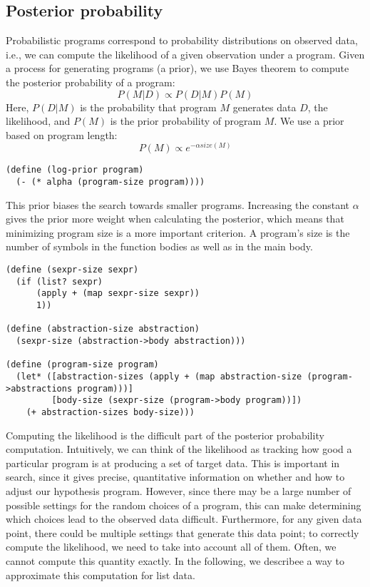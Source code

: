 \documentclass[a4paper,10pt]{article}
\begin{document}
\subsection{Posterior probability}

Probabilistic programs correspond to probability distributions on observed data, i.e., we can compute the likelihood of a given observation under a program. Given a process for generating programs (a prior), we use Bayes theorem to compute the posterior probability of a program:
\begin{equation}P(M|D)\propto P(D|M)P(M)\end{equation}
Here, $P(D|M)$ is the probability that program $M$ generates data $D$, the likelihood, and $P(M)$ is the prior probability of program $M$. We use a prior based on program length:
\begin{equation}P(M)\propto e^{-\alpha \mathit{size}(M)}\end{equation}
\begin{lstlisting}[frame=trBL]
(define (log-prior program)
  (- (* alpha (program-size program))))
\end{lstlisting}
This prior biases the search towards smaller programs. Increasing the constant $\alpha$ gives the prior more weight when calculating the posterior, which means that minimizing program size is a more important criterion. A program's size is the number of symbols in the function bodies as well as in the main body.
\begin{lstlisting}[frame=trBL]
(define (sexpr-size sexpr)
  (if (list? sexpr)
      (apply + (map sexpr-size sexpr))
      1))

(define (abstraction-size abstraction)
  (sexpr-size (abstraction->body abstraction)))
  
(define (program-size program)
  (let* ([abstraction-sizes (apply + (map abstraction-size (program->abstractions program)))]
         [body-size (sexpr-size (program->body program))])
    (+ abstraction-sizes body-size)))
\end{lstlisting}
Computing the likelihood is the difficult part of the posterior probability computation. Intuitively, we can think of the likelihood as tracking how good a particular program is at producing a set of target data.  This is important in search, since it gives precise, quantitative information on whether and how to adjust our hypothesis program. However, since there may be a large number of possible settings for the random choices of a program, this can make determining which choices lead to the observed data difficult. Furthermore, for any given data point, there could be multiple settings that generate this data point; to correctly compute the likelihood, we need to take into account all of them. Often, we cannot compute this quantity exactly. In the following, we describee a way to approximate this computation for list data.
\end{document}
